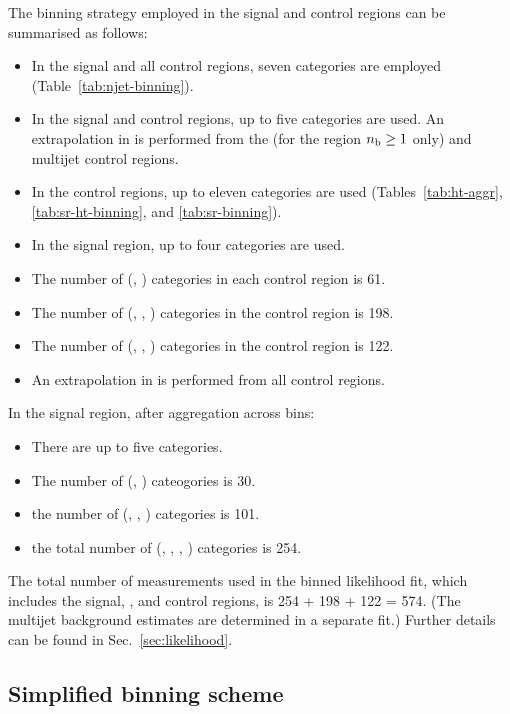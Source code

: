 The binning strategy employed in the signal and control regions can be
summarised as follows:
\begin{itemize}
\item In the signal and all control regions, seven \njet categories
  are employed (Table~\ref{tab:njet-binning}). 
\item In the signal and \mj control regions, up to five \nb categories
  are used. An extrapolation in \nb is performed from the \mmj (for
  the region $n_{\text{b}} \geq 1$ only) and multijet control regions.
\item In the control regions, up to eleven \scalht categories are
  used (Tables~\ref{tab:ht-aggr}, \ref{tab:sr-ht-binning}, and
  \ref{tab:sr-binning}).  
\item In the signal region, up to four \HTmiss categories are used.
\item The number of (\njet, \scalht) categories in each control region
  is 61.
\item The number of (\njet, \scalht, \nb) categories in the \mj
  control region is 198.
\item The number of (\njet, \scalht, \nb) categories in the \mmj
  control region is 122.
\item An extrapolation in \HTmiss is performed from all control regions.
\end{itemize}
In the signal region, after aggregation across \scalht bins: 
\begin{itemize}
\item There are up to five \scalht categories.
\item The number of (\njet, \scalht) cateogories is 30.
\item the number of (\njet, \scalht, \nb) categories is 101.
\item the total number of (\njet, \scalht, \nb, \HTmiss) categories is
  254. 
\end{itemize}

The total number of measurements used in the binned likelihood fit,
which includes the signal, \mj, and \mmj control regions, is 254 + 198
+ 122 = 574. (The multijet background estimates are determined in a
separate fit.) Further details can be found in
Sec.~\ref{sec:likelihood}. 

\subsection{Simplified binning scheme}
\label{sec:aggregated}

